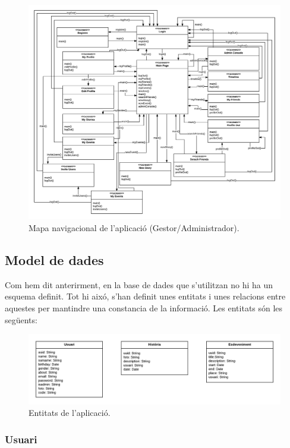 \documentclass[11pt,catalan,listoffigures,listoftables]{tfgetsinf}
\begin{document}
\begin{figure}[H]
\includegraphics[width=15cm]{images/image10}
\centering
\caption[]{Mapa navigacional de l'aplicació (Gestor/Administrador).}
\centering
\end{figure}

\subsection{Model de dades}

Com hem dit anterirment, en la base de dades que s'utilitzan no hi ha un esquema definit. Tot hi aixó, s'han definit unes entitats i unes relacions entre aquestes per mantindre una constancia de la informació. Les entitats són les següents:

\begin{figure}[h]
\includegraphics[width=15cm]{images/image6}
\centering
\caption[]{Entitats de l'aplicació.}
\centering
\end{figure}

\subsubsection{Usuari}
\end{document}
